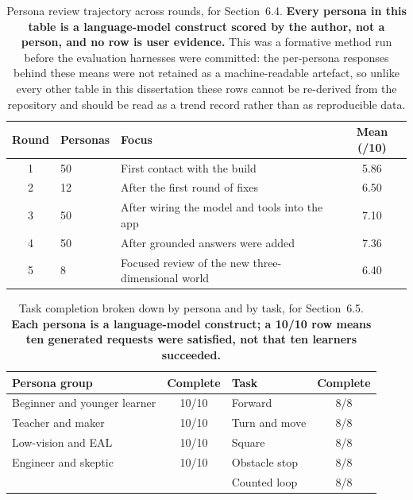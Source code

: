 \documentclass[11pt,a4paper]{report}
\begin{document}
\begin{table}[h]
\centering\small
\renewcommand{\arraystretch}{1.2}
\begin{tabular}{clp{6.8cm}c}
\toprule
Round & Personas & Focus & Mean (/10) \\
\midrule
1 & 50 & First contact with the build & 5.86 \\
2 & 12 & After the first round of fixes & 6.50 \\
3 & 50 & After wiring the model and tools into the app & 7.10 \\
4 & 50 & After grounded answers were added & 7.36 \\
5 & 8 & Focused review of the new three-dimensional world & 6.40 \\
\bottomrule
\end{tabular}
\caption{Persona review trajectory across rounds, for Section~6.4. \textbf{Every persona in this table is a language-model construct scored by the author, not a person, and no row is user evidence.} This was a formative method run before the evaluation harnesses were committed: the per-persona responses behind these means were not retained as a machine-readable artefact, so unlike every other table in this dissertation these rows cannot be re-derived from the repository and should be read as a trend record rather than as reproducible data.}
\label{tab:persona}
\end{table}

\begin{table}[h]
\centering\small
\renewcommand{\arraystretch}{1.2}
\begin{tabular}{lc@{\hskip 1.2cm}lc}
\toprule
Persona group & Complete & Task & Complete \\
\midrule
Beginner and younger learner & 10/10 & Forward & 8/8 \\
Teacher and maker & 10/10 & Turn and move & 8/8 \\
Low-vision and EAL & 10/10 & Square & 8/8 \\
Engineer and skeptic & 10/10 & Obstacle stop & 8/8 \\
 & & Counted loop & 8/8 \\
\bottomrule
\end{tabular}
\caption{Task completion broken down by persona and by task, for Section~6.5. \textbf{Each persona is a language-model construct; a 10/10 row means ten generated requests were satisfied, not that ten learners succeeded.}}
\label{tab:objbreakdown}
\end{table}
\end{document}
